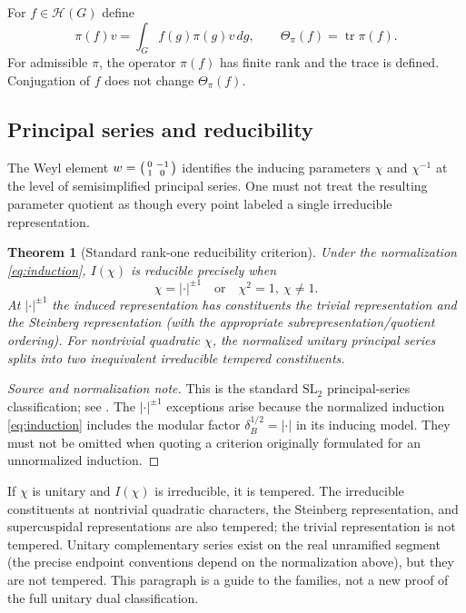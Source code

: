 \documentclass[12pt,letterpaper]{amsart}
\numberwithin{equation}{section}
\newtheorem{theorem}{Theorem}[section]
\theoremstyle{definition}
\theoremstyle{remark}
\newcommand{\calH}{\mathcal H}
\newcommand{\tr}{\operatorname{tr}}
\begin{document}
For $f\in\calH(G)$ define
\begin{equation}\label{eq:opFT}
\pi(f)v=\int_Gf(g)\pi(g)v\,dg,
\qquad \Theta_\pi(f)=\tr\pi(f).
\end{equation}
For admissible $\pi$, the operator $\pi(f)$ has finite rank and the trace is defined. Conjugation of $f$ does not change $\Theta_\pi(f)$.

\subsection{Principal series and reducibility}
The Weyl element $w=\begin{psmallmatrix}0&-1\\1&0\end{psmallmatrix}$ identifies the inducing parameters $\chi$ and $\chi^{-1}$ at the level of semisimplified principal series.  One must not treat the resulting parameter quotient as though every point labeled a single irreducible representation.

\begin{theorem}[Standard rank-one reducibility criterion]\label{thm:reducibility}
Under the normalization \eqref{eq:induction}, $I(\chi)$ is reducible precisely when
\begin{equation}\label{eq:reducibility}
\chi=|\cdot|^{\pm1}\quad\text{or}\quad \chi^2=1,\ \chi\ne1.
\end{equation}
At $|\cdot|^{\pm1}$ the induced representation has constituents the trivial representation and the Steinberg representation (with the appropriate subrepresentation/quotient ordering).  For nontrivial quadratic $\chi$, the normalized unitary principal series splits into two inequivalent irreducible tempered constituents.
\end{theorem}
\begin{proof}[Source and normalization note]
This is the standard $\mathrm{SL}_2$ principal-series classification; see \cite{GG63,Si79,CaNotes}.  The $|\cdot|^{\pm1}$ exceptions arise because the normalized induction \eqref{eq:induction} includes the modular factor $\delta_B^{1/2}=|\cdot|$ in its inducing model.  They must not be omitted when quoting a criterion originally formulated for an unnormalized induction.
\end{proof}

If $\chi$ is unitary and $I(\chi)$ is irreducible, it is tempered. The irreducible constituents at nontrivial quadratic characters, the Steinberg representation, and supercuspidal representations are also tempered; the trivial representation is not tempered.  Unitary complementary series exist on the real unramified segment (the precise endpoint conventions depend on the normalization above), but they are not tempered.  This paragraph is a guide to the families, not a new proof of the full unitary dual classification.
\end{document}
